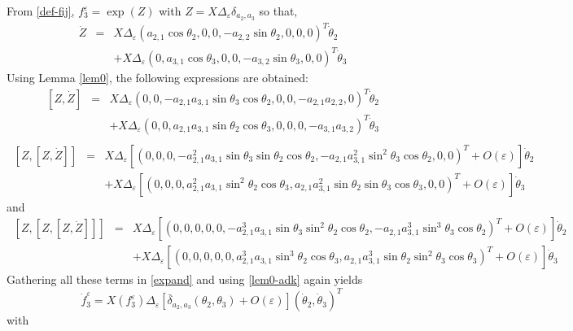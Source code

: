 \documentclass[a4paper,twoside]{article}
\def \eps {\varepsilon}
\begin{document}
From \eqref{def-fij}, $f_3^\eps= \exp(Z)$ with  $Z= X \Delta_\eps \delta_{a_2,a_3}$ so that,
\[
\begin{array}{lcl}
~\dot Z & = & X \Delta_\eps \left( a_{2,1} \cos \theta_2,0,0,-a_{2,2} \sin \theta_2,0,0,0 \right)^T \dot \theta_2 \\
    & & + X \Delta_\eps \left( 0, a_{3,1} \cos \theta_3,0,0,-a_{3,2} \sin \theta_3,0,0 \right)^T \dot \theta_3
\end{array}
\]
Using Lemma \ref{lem0}, the following expressions are obtained:
\[
\begin{array}{lcl}
~[Z,\dot Z] & = & X \Delta_\eps \left(0,0,-a_{2,1} a_{3,1} \sin \theta_3 \cos \theta_2,0,0,-a_{2,1}a_{2,2},0 \right)^T 
\dot \theta_2 \\
 & & + X \Delta_\eps \left(0,0, a_{2,1} a_{3,1} \sin \theta_2 \cos \theta_3,0,0,0,-a_{3,1} a_{3,2} \right)^T 
\dot \theta_3 \\
\end{array}
\]
\[
\begin{array}{lcl}
~[Z,[Z,\dot Z]] & = & X \Delta_\eps \left[ \left( 0,0,0,-a_{2,1}^2 a_{3,1} \sin \theta_3 \sin \theta_2 \cos \theta_2,
-a_{2,1}a_{3,1}^2 \sin^2 \theta_3 \cos \theta_2,0,0 \right)^T +O(\eps) \right]  \dot \theta_2 \\
 & & + X \Delta_\eps \left[ \left( 0,0,0,a_{2,1}^2 a_{3,1} \sin^2 \theta_2 \cos \theta_3,
a_{2,1}a_{3,1}^2 \sin \theta_2 \sin\theta_3 \cos \theta_3,0,0 \right)^T + O(\eps) \right] \dot \theta_3 
\end{array}
\]
and 
\[
\begin{array}{lcl}
~[Z,[Z,[Z,\dot Z]]] & = & X \Delta_\eps \left[ \left(0,0,0,0,0,-a_{2,1}^3 a_{3,1} \sin \theta_3 \sin^2 \theta_2 \cos \theta_2, 
-a_{2,1}a_{3,1}^3 \sin^3 \theta_3 \cos \theta_2 \right)^T +O(\eps) \right] \dot \theta_2 \\
 & & + X \Delta_\eps \left[ \left(0,0,0,0,0,a_{2,1}^3 a_{3,1}  \sin^3 \theta_2 \cos \theta_3,
a_{2,1} a_{3,1}^3 \sin \theta_2 \sin^2 \theta_3 \cos \theta_3 \right)^T +O(\eps) \right] \dot \theta_3 
\end{array}
\]
Gathering all these terms in \eqref{expand} and using \eqref{lem0-adk} again  yields
\begin{equation}
\label{df4}
\dot f_3^\eps= X(f_3^\eps) \Delta_\eps \left[ \bar \delta_{a_2,a_3}(\theta_2, \theta_3) + O(\eps) \right] (\dot \theta_2, \dot \theta_3)^T
\end{equation}
with
\end{document}
